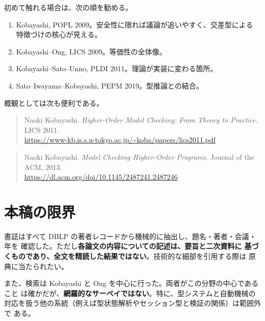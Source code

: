 \documentclass[11pt,a4paper]{ltjsarticle}
\begin{document}
初めて触れる場合は、次の順を勧める。

\begin{enumerate}
  \item Kobayashi, POPL 2009。安全性に限れば議論が追いやすく、交差型による
  特徴づけの核心が見える。
  \item Kobayashi--Ong, LICS 2009。等価性の全体像。
  \item Kobayashi--Sato--Unno, PLDI 2011。理論が実装に変わる箇所。
  \item Sato--Iwayama--Kobayashi, PEPM 2019。型推論との結合。
\end{enumerate}

概観としては次も便利である。

\begin{quote}
Naoki Kobayashi.
\emph{Higher-Order Model Checking: From Theory to Practice.}
LICS 2011.\\
\url{https://www-kb.is.s.u-tokyo.ac.jp/~koba/papers/lics2011.pdf}
\end{quote}

\begin{quote}
Naoki Kobayashi.
\emph{Model Checking Higher-Order Programs.}
Journal of the ACM, 2013.\\
\url{https://dl.acm.org/doi/10.1145/2487241.2487246}
\end{quote}

\section{本稿の限界}

書誌はすべて DBLP の著者レコードから機械的に抽出し、題名・著者・会議・年を
確認した。ただし\textbf{各論文の内容についての記述は、要旨と二次資料に
基づくものであり、全文を精読した結果ではない}。技術的な細部を引用する際は
原典に当たられたい。

また、検索は Kobayashi と Ong を中心に行った。両者がこの分野の中心であること
は確かだが、\textbf{網羅的なサーベイではない}。特に、型システムと自動機械の
対応を扱う他の系統（例えば型状態解析やセッション型と検証の関係）は範囲外で
ある。
\end{document}
